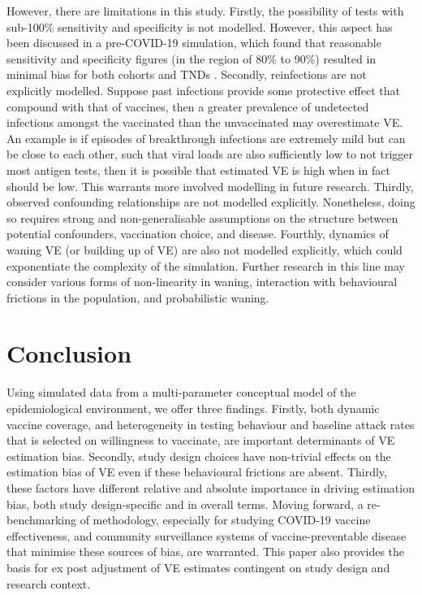 \documentclass[12pt]{article}
\begin{document}
However, there are limitations in this study. Firstly, the possibility of tests with sub-100\% sensitivity and specificity is not modelled. However, this aspect has been discussed in a pre-COVID-19 simulation, which found that reasonable sensitivity and specificity figures (in the region of 80\% to 90\%) resulted in minimal bias for both cohorts and TNDs \citep{jackson2015effects}. Secondly, reinfections are not explicitly modelled. Suppose past infections provide some protective effect that compound with that of vaccines, then a greater prevalence of undetected infections amongst the vaccinated than the unvaccinated may overestimate VE. An example is if episodes of breakthrough infections are extremely mild but can be close to each other, such that viral loads are also sufficiently low to not trigger most antigen tests, then it is possible that estimated VE is high when in fact should be low. This warrants more involved modelling in future research. Thirdly, observed confounding relationships are not modelled explicitly. Nonetheless, doing so requires strong and non-generalisable assumptions on the structure between potential confounders, vaccination choice, and disease. Fourthly, dynamics of waning VE (or building up of VE) are also not modelled explicitly, which could exponentiate the complexity of the simulation. Further research in this line may consider various forms of non-linearity in waning, interaction with behavioural frictions in the population, and probabilistic waning. 

\section{Conclusion}

Using simulated data from a multi-parameter conceptual model of the epidemiological environment, we offer three findings. Firstly, both dynamic vaccine coverage, and heterogeneity in testing behaviour and baseline attack rates that is selected on willingness to vaccinate, are important determinants of VE estimation bias. Secondly, study design choices have non-trivial effects on the estimation bias of VE even if these behavioural frictions are absent.  Thirdly, these factors have different relative and absolute importance in driving estimation bias, both study design-specific and in overall terms. Moving forward, a re-benchmarking of methodology, especially for studying COVID-19 vaccine effectiveness, and community surveillance systems of vaccine-preventable disease that minimise these sources of bias, are warranted. This paper also provides the basis for ex post adjustment of VE estimates contingent on study design and research context.
\end{document}
